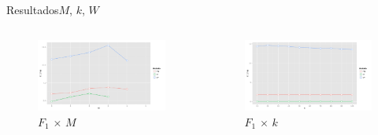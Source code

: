 \begin{frame}{Resultados}{$M$, $k$, $W$}
\begin{columns}[b]
\begin{figure}[ht]
    \begin{center}
    \includegraphics[width=1.1\textwidth]{../img/F1_M}
    \end{center}
    \caption{$F_1$ $\times$ $M$}
    \label{fig:F1_M}
\end{figure}

\begin{figure}[ht]
    \begin{center}
    \includegraphics[width=1.1\textwidth]{../img/F1_k}
    \end{center}
    \caption{$F_1$ $\times$ $k$}
    \label{fig:F1_H}
\end{figure}


\end{columns}
\end{frame}
